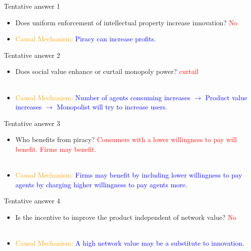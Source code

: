 \documentclass{beamer}
\numberwithin{equation}{section}
\begin{document}
\begin{frame}{Tentative answer 1}
\begin{itemize}
    \item Does uniform enforcement of intellectual property increase innovation? \textcolor{red}{No}
    \item \textcolor{orange}{Causal Mechanism:} \textcolor{blue}{Piracy can increase profits.}
\end{itemize}
\end{frame}
\begin{frame}{Tentative answer 2}
\begin{itemize}
    \item Does social value enhance or curtail monopoly power? \textcolor{red}{curtail}\\~\\
    \item \textcolor{orange}{Causal Mechanism:} \textcolor{blue}{Number of agents consuming increases $\rightarrow$ Product value increases $\rightarrow$ Monopolist will try to increase users.}
\end{itemize}
\end{frame}
\begin{frame}{Tentative answer 3}
\begin{itemize}
    \item Who benefits from piracy?  \textcolor{red}{Consumers with a lower willingness to pay will benefit. Firms may benefit.}\\~\\
    \item \textcolor{orange}{Causal Mechanism:} \textcolor{blue}{Firms may benefit by including lower willingness to pay agents by charging higher willingness to pay agents more.}
\end{itemize}
\end{frame}
\begin{frame}{Tentative answer 4}
\begin{itemize}
    \item Is the incentive to improve the product independent of network value? \textcolor{red}{No}\\~\\
    \item \textcolor{orange}{Causal Mechanism:} \textcolor{blue}{A high network value may be a substitute to innovation.}
\end{itemize}
\end{frame}
\end{document}

